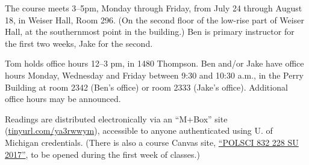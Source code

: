The course meets 3--5pm, Monday through Friday, from July 24 through
August 18, in Weiser Hall, Room 296. (On the second floor of the
low-rise part of Weiser Hall, at the southernmost point in the
building.)  Ben is primary instructor for the first two weeks, Jake
for the second.

Tom holds office hours 12--3 pm, in 1480 Thompson. Ben and/or Jake
have office hours Monday, Wednesday and Friday between 9:30 and 10:30
a.m., in the Perry Building at room 2342 (Ben's office) or room 2333
(Jake's office).  Additional office hours may be announced.

Readings are distributed electronically via an ``M+Box'' site
(\url{tinyurl.com/ya3rwwym}), accessible to anyone authenticated using
U. of Michigan credentials.  (There is also a 
course Canvas site,  
\href{https://umich.instructure.com/courses/187094}{``POLSCI 832 228
SU 2017''}, to be opened during the first week of classes.)